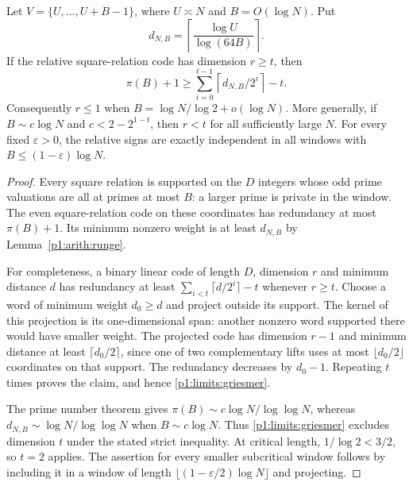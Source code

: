 \begin{lemma}
\label{p1:limits:local-rigidity}
Let $V=\{U,\ldots,U+B-1\}$, where $U\asymp N$ and $B=O(\log N)$.
Put
\[
 d_{N,B}=\left\lceil\frac{\log U}{\log(64B)}\right\rceil.
\]
If the relative square-relation code has dimension $r\ge t$, then
\begin{equation}
 \pi(B)+1\ge
 \sum_{i=0}^{t-1}\left\lceil d_{N,B}/2^i\right\rceil-t.
 \label{p1:limits:griesmer}
\end{equation}
Consequently $r\le1$ when $B=\log N/\log2+o(\log N)$.
More generally, if $B\sim c\log N$ and
$c<2-2^{1-t}$, then $r<t$ for all sufficiently large $N$.
For every fixed $\varepsilon>0$, the relative signs are exactly
independent in all windows with $B\le(1-\varepsilon)\log N$.
\end{lemma}
\begin{proof}
Every square relation is supported on the $D$ integers whose odd
prime valuations are all at primes at most $B$: a larger prime is
private in the window.  The even square-relation code on these
coordinates has redundancy at most $\pi(B)+1$.  Its minimum nonzero
weight is at least $d_{N,B}$ by Lemma~\ref{p1:arith:runge}.

For completeness, a binary linear code of length $D$, dimension $r$
and minimum distance $d$ has redundancy at least
$\sum_{i<t}\lceil d/2^i\rceil-t$ whenever $r\ge t$.
Choose a word of minimum weight $d_0\ge d$ and project outside its
support.  The kernel of this projection is its one-dimensional span:
another nonzero word supported there would have smaller weight.
The projected code has dimension $r-1$ and minimum distance at least
$\lceil d_0/2\rceil$, since one of two complementary lifts uses at
most $\lfloor d_0/2\rfloor$ coordinates on that support.  The
redundancy decreases by $d_0-1$.  Repeating $t$ times proves the
claim, and hence \eqref{p1:limits:griesmer}.

The prime number theorem gives
$\pi(B)\sim c\log N/\log\log N$, whereas
$d_{N,B}\sim\log N/\log\log N$ when $B\sim c\log N$.
Thus \eqref{p1:limits:griesmer} excludes dimension $t$ under the
stated strict inequality.  At critical length, $1/\log2<3/2$,
so $t=2$ applies.  The assertion for every smaller subcritical
window follows by including it in a window of length
$\lfloor(1-\varepsilon/2)\log N\rfloor$ and projecting.
\end{proof}

